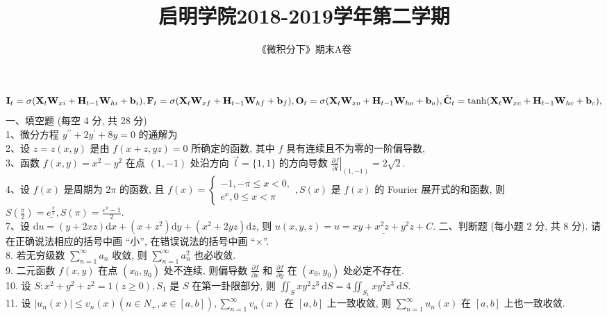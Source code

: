 \documentclass[a4paper,11pt,UTF8]{article}
\title{启明学院2018-2019学年第二学期}
\author{《微积分下》期末A卷}
\begin{document}
\maketitle
$$
\mathbf{I}_{t} =\sigma(\mathbf{X}_t\mathbf{W}_{xi}+\mathbf{H}_{t-1}\mathbf{W}_{hi}+\mathbf{b}_i), \\
\mathbf{F}_{t} =\sigma(\mathbf{X}_t\mathbf{W}_{xf}+\mathbf{H}_{t-1}\mathbf{W}_{hf}+\mathbf{b}_f), \\
\mathbf{O}_{t} =\sigma(\mathbf{X}_t\mathbf{W}_{xo}+\mathbf{H}_{t-1}\mathbf{W}_{ho}+\mathbf{b}_o),\\
\tilde{\mathbf{C}}_t=\tanh(\mathbf{X}_t\mathbf{W}_{xc}+\mathbf{H}_{t-1}\mathbf{W}_{hc}+\mathbf{b}_c),
$$
\noindent 一、填空题 (每空 4 分, 共 28 分)\\
1、微分方程 $y^{\prime \prime}+2 y^{\prime}+8 y=0$ 的通解为\\
2、设 $z=z(x, y)$ 是由 $f(x+z, y z)=0$ 所确定的函数, 其中 $f$ 具有连续且不为零的一阶偏导数,\\
3、函数 $f(x, y)=x^2-y^2$ 在点 $(1,-1)$ 处沿方向 $\vec{l}=\{1,1\}$ 的方向导数 $\left.\frac{\partial f}{\partial l}\right|_{(1,-1)}=2 \sqrt{2}$.\\
4、设 $f(x)$ 是周期为 $2 \pi$ 的函数, 且 $f(x)=\left\{\begin{array}{l}-1,-\pi \leq x<0, \\ e^x, 0 \leq x<\pi\end{array}, S(x)\right.$ 是 $f(x)$ 的 Fourier 展开式的和函数, 则 $S\left(\frac{\pi}{2}\right)=\underline{e^{\frac{\pi}{2}}}, S(\pi)=\frac{e^\pi-1}{2}$.\\
7、设 $\mathrm{d} u=(y+2 x z) \mathrm{d} x+\left(x+z^2\right) \mathrm{d} y+\left(x^2+2 y z\right) \mathrm{d} z$, 则 $u(x, y, z)=\underline{u=x y+x^2 z+y^2 z+C}$.
二、判断题 (每小题 2 分, 共 8 分). 请在正确说法相应的括号中画 “小”, 在错误说法的括号中画 “×”.\\
8. 若无穷级数 $\sum_{n=1}^{\infty} a_n$ 收敛, 则 $\sum_{n=1}^{\infty} a_n^2$ 也必收敛.\\
9. 二元函数 $f(x, y)$ 在点 $\left(x_0, y_0\right)$ 处不连续, 则偏导数 $\frac{\partial f}{\partial x}$ 和 $\frac{\partial f}{\partial y}$ 在 $\left(x_0, y_0\right)$ 处必定不存在.\\
10. 设 $S: x^2+y^2+z^2=1(z \geq 0), S_1$ 是 $S$ 在第一卦限部分, 则 $\iint_S x y^2 z^3 \mathrm{~d} S=4 \iint_{S_1} x y^2 z^3 \mathrm{~d} S$.\\
11. 设 $\left|u_n(x)\right| \leq v_n(x)\left(n \in N_{+}, x \in[a, b]\right), \sum_{n=1}^{\infty} v_n(x)$ 在 $[a, b]$ 上一致收敛, 则 $\sum_{n=1}^{\infty} u_n(x)$ 在 $[a, b]$ 上也一致收敛.\\
\end{document}
